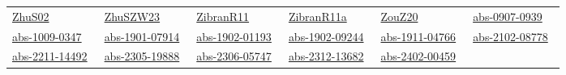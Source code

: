 \begin{longtable}{*{6}{l}}
\href{works/ZhuS02.pdf}{ZhuS02}~\cite{ZhuS02} & \href{}{ZhuSZW23}~\cite{ZhuSZW23} & \href{works/ZibranR11.pdf}{ZibranR11}~\cite{ZibranR11} & \href{works/ZibranR11a.pdf}{ZibranR11a}~\cite{ZibranR11a} & \href{works/ZouZ20.pdf}{ZouZ20}~\cite{ZouZ20} & \href{works/abs-0907-0939.pdf}{abs-0907-0939}~\cite{abs-0907-0939}\\ 
\href{works/abs-1009-0347.pdf}{abs-1009-0347}~\cite{abs-1009-0347} & \href{works/abs-1901-07914.pdf}{abs-1901-07914}~\cite{abs-1901-07914} & \href{works/abs-1902-01193.pdf}{abs-1902-01193}~\cite{abs-1902-01193} & \href{works/abs-1902-09244.pdf}{abs-1902-09244}~\cite{abs-1902-09244} & \href{works/abs-1911-04766.pdf}{abs-1911-04766}~\cite{abs-1911-04766} & \href{works/abs-2102-08778.pdf}{abs-2102-08778}~\cite{abs-2102-08778}\\ 
\href{works/abs-2211-14492.pdf}{abs-2211-14492}~\cite{abs-2211-14492} & \href{works/abs-2305-19888.pdf}{abs-2305-19888}~\cite{abs-2305-19888} & \href{works/abs-2306-05747.pdf}{abs-2306-05747}~\cite{abs-2306-05747} & \href{works/abs-2312-13682.pdf}{abs-2312-13682}~\cite{abs-2312-13682} & \href{works/abs-2402-00459.pdf}{abs-2402-00459}~\cite{abs-2402-00459} & \end{longtable}
